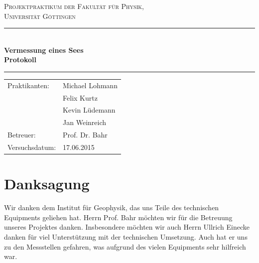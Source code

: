 \documentclass[12pt,a4paper,titlepage,headinclude,bibtotoc]{scrartcl}
\begin{document}
\begin{titlepage}
\centering
\textsc{\Large Projektpraktikum der Fakultät für
  Physik,\\[1ex] Universität Göttingen}

\vspace*{2cm}

\rule{\textwidth}{1pt}\\[0.5cm]
{\huge \bfseries
  Vermessung eines Sees \\[1ex]
  Protokoll}\\[0.5cm]
\rule{\textwidth}{1pt}

\vspace*{2cm}

\begin{Large}
\begin{tabular}{ll}
Praktikanten: &  Michael Lohmann\\
 &  Felix Kurtz\\
 &  Kevin Lüdemann\\
 &  Jan Weinreich\\
 Betreuer: & Prof. Dr. Bahr\\
 Versuchsdatum: & 17.06.2015\\
\end{tabular}
\end{Large}

\vspace*{3.8cm}

\begin{Large}
\end{Large}

\end{titlepage}

\tableofcontents
\thispagestyle{empty}
\newpage

\section*{Danksagung}
Wir danken dem Institut für Geophysik, das uns Teile des technischen Equipments geliehen hat.
Herrn Prof. Bahr möchten wir für die Betreuung unseres Projektes danken.
Insbesondere möchten wir auch Herrn Ullrich Einecke danken für viel Unterstützung mit der technischen Umsetzung.
Auch hat er uns zu den Messstellen gefahren, was aufgrund des vielen Equipments sehr hilfreich war.
\thispagestyle{empty}
\newpage

\setcounter{footnote}{0}
\setcounter{page}{1}
\end{document}
